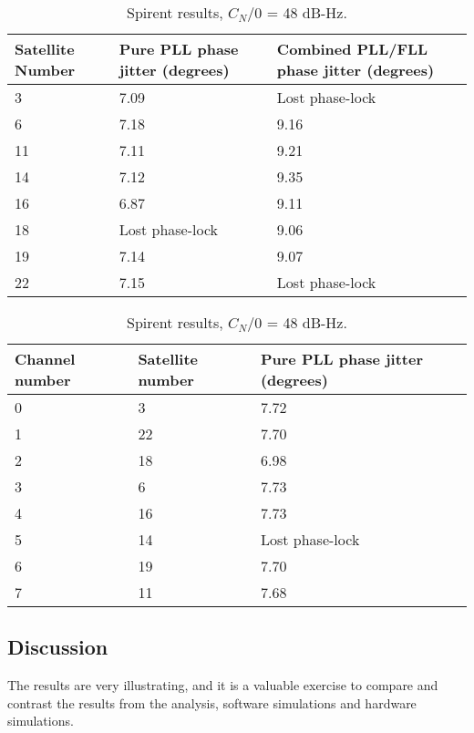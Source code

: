 \begin{table}[!htb]
\centering
\begin{tabular}{|l|l|l|}
\hline
\rowcolor[HTML]{C0C0C0} 
Satellite Number & Pure PLL phase jitter (degrees) & Combined PLL/FLL phase jitter (degrees) \\ \hline
3                & 7.09                            & Lost phase-lock                               \\ \hline
\rowcolor[HTML]{EFEFEF} 
6                & 7.18                            & 9.16                                    \\ \hline
11               & 7.11                            & 9.21                                    \\ \hline
\rowcolor[HTML]{EFEFEF} 
14               & 7.12                            & 9.35                                    \\ \hline
16               & 6.87                            & 9.11                                    \\ \hline
\rowcolor[HTML]{EFEFEF} 
18               & Lost phase-lock                          & 9.06                                    \\ \hline
19               & 7.14                            & 9.07                                    \\ \hline
\rowcolor[HTML]{EFEFEF} 
22               & 7.15                            & Lost phase-lock                               \\ \hline
\end{tabular}
\caption{Spirent results, $C_N/0$ = 48 dB-Hz.}
\label{tab:SpirentCNO48}
\end{table}


\begin{table}[!htb]
\centering
\begin{tabular}{|l|l|l|}
\hline
\rowcolor[HTML]{C0C0C0} 
Channel number & Satellite number & Pure PLL phase jitter (degrees)      \\ \hline
0              & 3                & 7.72 \\ \hline
\rowcolor[HTML]{EFEFEF} 
1              & 22               & 7.70 \\ \hline
2              & 18               & 6.98\\ \hline
\rowcolor[HTML]{EFEFEF} 
3              & 6                & 7.73 \\ \hline
4              & 16               & 7.73 \\ \hline
\rowcolor[HTML]{EFEFEF} 
5              & 14               & Lost phase-lock \\ \hline
6              & 19               & 7.70 \\ \hline
\rowcolor[HTML]{EFEFEF} 
7              & 11               & 7.68 \\ \hline
\end{tabular}
\label{tab:SpirentCNO42}
\caption{Spirent results, $C_N/0$ = 48 dB-Hz.}
\end{table}


\clearpage
\subsection{Discussion}

The results are very illustrating, and it is a valuable exercise to compare and contrast the results from the analysis, software simulations and hardware simulations.


\label{eq:JwoJitter}



